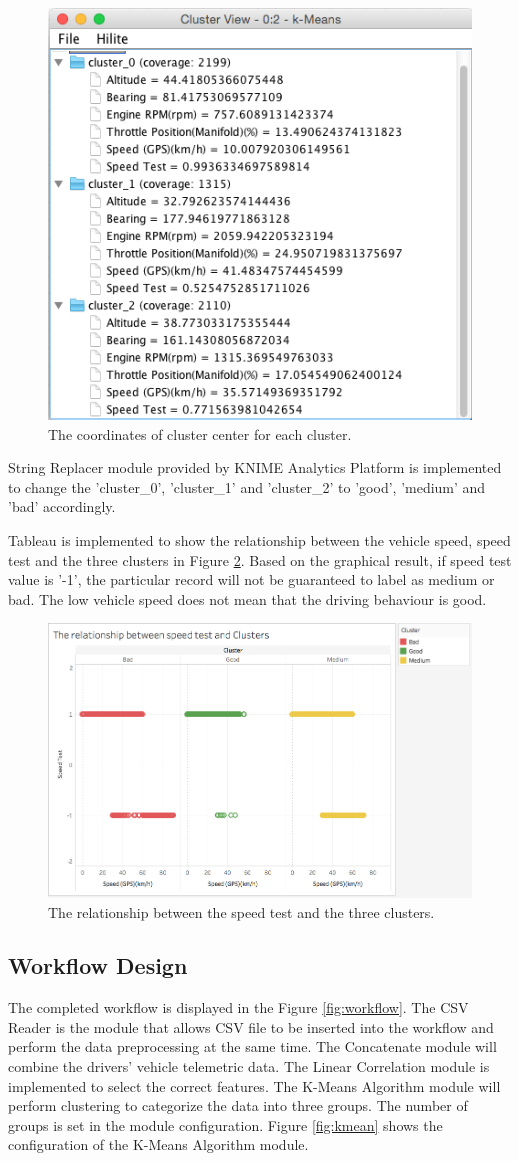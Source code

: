 \begin{figure}[hbt!]\centering
\includegraphics[height=.5\textwidth]{image/cluster}
\caption{The coordinates of cluster center for each cluster.}
\label{fig:cluster}
\end{figure}


String Replacer module provided by KNIME Analytics Platform is implemented to change the 'cluster\_0', 'cluster\_1' and 'cluster\_2' to 'good', 'medium' and 'bad' accordingly.

Tableau is implemented to show the relationship between the vehicle speed, speed test and the three clusters in Figure \ref{fig:cluster_result}. Based on the graphical result, if speed test value is '-1', the particular record will not be guaranteed to label as  medium or bad. The low vehicle speed does not mean that the driving behaviour is good.

\begin{figure}[hbt!]\centering
\includegraphics[height=.5\textwidth]{image/clusterresult}
\caption{The relationship between the speed test and the three clusters.}
\label{fig:cluster_result}
\end{figure}


\subsection{Workflow Design}
The completed workflow is displayed in the Figure \ref{fig:workflow}. The CSV Reader is the module that allows CSV file to be inserted into the workflow and perform the data preprocessing at the same time. The Concatenate module will combine the drivers' vehicle telemetric data. The Linear Correlation module is implemented to select the correct features. The K-Means Algorithm module will perform clustering to categorize the data into three groups. The number of groups is set in the module configuration. Figure \ref{fig:kmean} shows the configuration of the K-Means Algorithm module.

